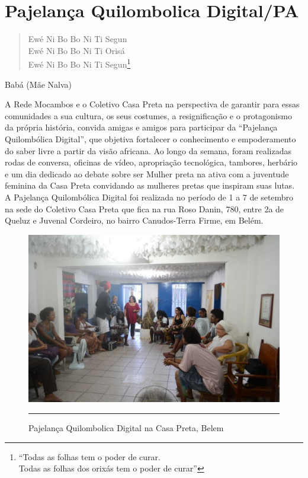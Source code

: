 \documentclass[a4paper, 11pt, oneside]{Relatorio_sem}  %
\begin{document}
\section{Pajelança Quilombolica Digital/PA}
\begin{quote}
  Ewé Ni Bo Bo Ni Ti Segun\\
  Ewé Ni Bo Bo Ni Ti Orisá\\
  Ewé Ni Bo Bo Ni Ti Segun\footnote{``Todas as folhas tem o poder de curar.\\
Todas as folhas dos orixás tem o poder de curar''}
\end{quote}
\begin{flushright}
Babá (Mãe Nalva)
\end{flushright}

A Rede Mocambos e o Coletivo Casa Preta na perspectiva de garantir
para essas comunidades a sua cultura, os seus costumes, a
resignificação e o protagonismo da própria história, convida amigas e
amigos para participar da “Pajelança Quilombólica Digital”, que
objetiva fortalecer o conhecimento e empoderamento do saber livre a
partir da visão africana.  Ao longo da semana, foram realizadas rodas
de conversa, oficinas de vídeo, apropriação tecnológica, tambores,
herbário e um dia dedicado ao debate sobre ser Mulher preta na ativa
com a juventude feminina da Casa Preta convidando as mulheres pretas
que inspiram suas lutas.  A Pajelança Quilombólica Digital foi
realizada no período de 1 a 7 de setembro na sede do Coletivo Casa
Preta que fica na rua Roso Danin, 780, entre 2a de Queluz e Juvenal
Cordeiro, no bairro Canudos-Terra Firme, em Belém.

\begin{figure}[htbp]
  \centering
  \includegraphics[width=\textwidth]{./Fig/PajelancaCasaPreta.pdf}
  \rule{35em}{0.5pt}
  \caption[Pajelança Quilombolica Digital na Casa Preta,
    Belem]{Pajelança Quilombolica Digital na Casa Preta, Belem}
  \label{fig:PajelancaPA}
\end{figure}
\end{document}
